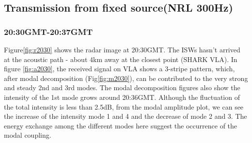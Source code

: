 \subsection{Transmission from fixed source(NRL 300Hz)}
\subsubsection{20:30GMT-20:37GMT}

Figure\ref{fig:r2030} shows the radar image at 20:30GMT. The ISWs hasn't arrived
at the acoustic path - about 4km away at the closest point (SHARK
VLA). In figure \ref{fig:a2030}, the received signal on VLA shows a 3-stripe
pattern, which, after modal decomposition (Fig\ref{fig:m2030}), can be
contributed to the very strong and steady 2nd and 3rd modes. The
modal decomposition figures also show the intensity of the 1st mode
grows around 20:36GMT. Although the fluctuation of the total
intensity is less than 2.5dB, from the modal amplitude plot, we can
see the increase of the intensity mode 1 and 4 and the decrease of
mode 2 and 3. The energy exchange among the different modes here
suggest the occurrence of the modal coupling.
%

